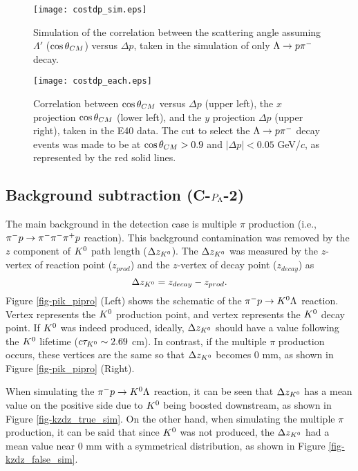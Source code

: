 \begin{figure}[!h]
    \centering
    \texttt{[image: costdp\_sim.eps]}
    \caption{Simulation of the correlation between the scattering angle assuming $\Lambda'$ ($\cos{\theta}_{CM}$) versus $\Delta p$, taken in the simulation of only $\Lambda\to p\pi^{-}$ decay.}
    \label{fig-costdp_sim}
\end{figure}

\begin{figure}[!h]
    \centering
    \texttt{[image: costdp\_each.eps]}
    \caption{Correlation between $\cos{\theta}_{CM}$ versus $\Delta p$ (upper left), the $x$ projection $\cos{\theta}_{CM}$ (lower left), and the $y$ projection $\Delta p$ (upper right), taken in the E40 data. The cut to select the $\Lambda\to p\pi^{-}$ decay events was made to be at $\cos{\theta}_{CM}>0.9$ and $|\Delta p| < 0.05$ GeV/$c$, as represented by the red solid lines.}
    \label{fig-costdp_each}
\end{figure}



\clearpage
\subsection{Background subtraction ({\bf C-$P_{\Lambda}$-2}) }
\label{sec-Pl-bgsubt}

The main background in the detection case  is multiple $\pi$ production (i.e., $\pi^- p \to \pi^-\pi^-\pi^+p$ reaction). This background contamination was removed by the $z$ component of $K^{0}$ path length ($\Delta z_{K^{0}}$). The $\Delta z_{K^{0}}$ was measured by the $z$-vertex of reaction point ($z_{prod}$) and the $z$-vertex of decay point ($z_{decay}$) as
\begin{equation}
  \Delta z_{K^{0}} = z_{decay} - z_{prod}.
\end{equation}
Figure \ref{fig-pik_pipro} (Left) shows the schematic of the $\pi^- p \to K^0 \Lambda$ reaction. Vertex  represents the $K^{0}$ production point, and vertex  represents the $K^{0}$ decay point. If $K^{0}$ was indeed produced, ideally, $\Delta z_{K^{0}}$ should have a value following the $K^{0}$ lifetime ($c\tau_{K^{0}} \sim 2.69$ cm).
In contrast, if the multiple $\pi$ production occurs, these vertices are the same so that $\Delta z_{K^{0}}$ becomes 0 mm, as shown in Figure \ref{fig-pik_pipro} (Right).

When simulating the $\pi^- p \to K^0 \Lambda$ reaction, it can be seen that $\Delta z_{K^{0}}$ has a mean value on the positive side due to $K^{0}$ being boosted downstream, as shown in Figure \ref{fig-kzdz_true_sim}. On the other hand, when simulating the multiple $\pi$ production, it can be said that since $K^{0}$ was not produced, the $\Delta z_{K^{0}}$ had a mean value near 0 mm with a symmetrical distribution, as shown in Figure \ref{fig-kzdz_false_sim}.

